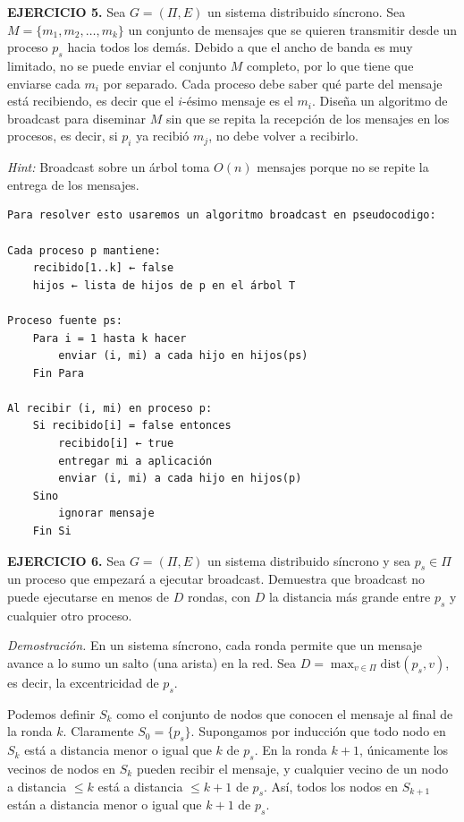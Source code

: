 \documentclass[12pt]{article}
\begin{document}
\begin{ejercicio}
\noindent \textbf{EJERCICIO 5.} 
Sea $G = (\Pi, E)$ un sistema distribuido síncrono. Sea $M = \{m_1, m_2, \dots, m_k\}$ un conjunto de mensajes que se quieren transmitir desde un proceso $p_s$ hacia todos los demás. Debido a que el ancho de banda es muy limitado, no se puede enviar el conjunto $M$ completo, por lo que tiene que enviarse cada $m_i$ por separado. Cada proceso debe saber qué parte del mensaje está recibiendo, es decir que el $i$-ésimo mensaje es el $m_i$. Diseña un algoritmo de broadcast para diseminar $M$ sin que se repita la recepción de los mensajes en los procesos, es decir, si $p_i$ ya recibió $m_j$, no debe volver a recibirlo.  

\noindent \textit{Hint:} Broadcast sobre un árbol toma $O(n)$ mensajes porque no se repite la entrega de los mensajes. \\
\end{ejercicio}

\begin{verbatim}
Para resolver esto usaremos un algoritmo broadcast en pseudocodigo: 

Cada proceso p mantiene:
    recibido[1..k] ← false
    hijos ← lista de hijos de p en el árbol T

Proceso fuente ps:
    Para i = 1 hasta k hacer
        enviar (i, mi) a cada hijo en hijos(ps)
    Fin Para

Al recibir (i, mi) en proceso p:
    Si recibido[i] = false entonces
        recibido[i] ← true
        entregar mi a aplicación
        enviar (i, mi) a cada hijo en hijos(p)
    Sino
        ignorar mensaje
    Fin Si 
\end{verbatim}

\begin{ejercicio}
\noindent \textbf{EJERCICIO 6.} 
Sea $G = (\Pi, E)$ un sistema distribuido síncrono y sea $p_s \in \Pi$ un proceso que
empezará a ejecutar broadcast. Demuestra que broadcast no puede ejecutarse en menos de $D$
rondas, con $D$ la distancia más grande entre $p_s$ y cualquier otro proceso. \\
\end{ejercicio}
\textit{Demostración.} 
En un sistema síncrono, cada ronda permite que un mensaje avance 
a lo sumo un salto (una arista) en la red. 
Sea $D = \max_{v \in \Pi} \mathrm{dist}(p_s,v)$, es decir, la excentricidad de $p_s$. 

Podemos definir $S_k$ como el conjunto de nodos que conocen el mensaje 
al final de la ronda $k$. Claramente $S_0 = \{p_s\}$. 
Supongamos por inducción que todo nodo en $S_k$ está a distancia 
menor o igual que $k$ de $p_s$. 
En la ronda $k+1$, únicamente los vecinos de nodos en $S_k$ 
pueden recibir el mensaje, y cualquier vecino de un nodo 
a distancia $\leq k$ está a distancia $\leq k+1$ de $p_s$. 
Así, todos los nodos en $S_{k+1}$ están a distancia 
menor o igual que $k+1$ de $p_s$. 
\end{document}
